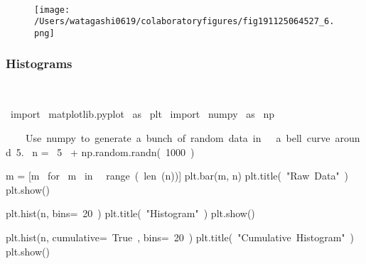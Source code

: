 \begin{paracol}{2}
\begin{cellExecute}[escapechar=~]
~~
\end{cellExecute}
\switchcolumn
\begin{resultCell}[escapechar=~]
\end{resultCell}
\end{paracol}

\begin{figure}[H]
\centering
\texttt{[image: /Users/watagashi0619/colaboratoryfigures/fig191125064527\_6.png]}
\end{figure}
\subsubsection{Histograms}

\begin{paracol}{2}
\smallskip
\begin{cellExecute}[escapechar=~]
~~
\end{cellExecute}
\switchcolumn
\begin{codeCell}[escapechar=~]
~\textcolor{mtk17}{import}~ matplotlib.pyplot ~\textcolor{mtk17}{as}~ plt
~\textcolor{mtk17}{import}~ numpy ~\textcolor{mtk17}{as}~ np

~~~\textcolor{mtk8}{ Use numpy to generate a bunch of random data in }~~\textcolor{mtk8}{a bell curve around 5.}~
n = ~\textcolor{mtk7}{5}~ + np.random.randn(~\textcolor{mtk7}{1000}~)

m = [m ~\textcolor{mtk17}{for}~ m ~\textcolor{mtk6}{in}~ ~\textcolor{mtk13}{range}~(~\textcolor{mtk13}{len}~(n))]
plt.bar(m, n)
plt.title(~\textcolor{mtk25}{"Raw Data"}~)
plt.show()

plt.hist(n, bins=~\textcolor{mtk7}{20}~)
plt.title(~\textcolor{mtk25}{"Histogram"}~)
plt.show()

plt.hist(n, cumulative=~\textcolor{mtk6}{True}~, bins=~\textcolor{mtk7}{20}~)
plt.title(~\textcolor{mtk25}{"Cumulative Histogram"}~)
plt.show()
\end{codeCell}
\end{paracol}

\begin{paracol}{2}
\begin{cellExecute}[escapechar=~]
~~
\end{cellExecute}
\switchcolumn
\begin{resultCell}[escapechar=~]
\end{resultCell}
\end{paracol}


